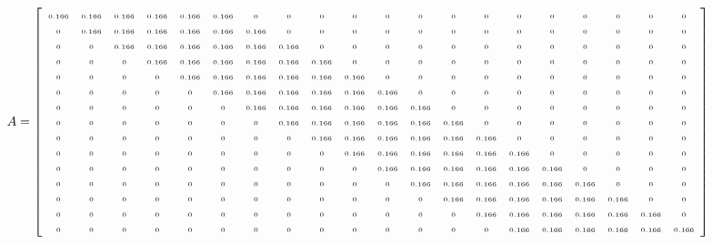 \documentclass[12pt]{article}
\begin{document}
        \[  \fontsize{5}{2}
            A=
            \left[
            \begin{array}{cccccccccccccccccccc}
                0.166 & 0.166 & 0.166 & 0.166 & 0.166 & 0.166 & 0 & 0 & 0 & 0 & 0 & 0 & 0 & 0 & 0 & 0 & 0 & 0 & 0 & 0\\
                0 & 0.166 & 0.166 & 0.166 & 0.166 & 0.166 & 0.166 & 0 & 0 & 0 & 0 & 0 & 0 & 0 & 0 & 0 & 0 & 0 & 0 & 0\\
                0 & 0 & 0.166 & 0.166 & 0.166 & 0.166 & 0.166 & 0.166 & 0 & 0 & 0 & 0 & 0 & 0 & 0 & 0 & 0 & 0 & 0 & 0\\
                0 & 0 & 0 & 0.166 & 0.166 & 0.166 & 0.166 & 0.166 & 0.166 & 0 & 0 & 0 & 0 & 0 & 0 & 0 & 0 & 0 & 0 & 0\\
                0 & 0 & 0 & 0 & 0.166 & 0.166 & 0.166 & 0.166 & 0.166 & 0.166 & 0 & 0 & 0 & 0 & 0 & 0 & 0 & 0 & 0 & 0\\
                0 & 0 & 0 & 0 & 0 & 0.166 & 0.166 & 0.166 & 0.166 & 0.166 & 0.166 & 0 & 0 & 0 & 0 & 0 & 0 & 0 & 0 & 0\\
                0 & 0 & 0 & 0 & 0 & 0 & 0.166 & 0.166 & 0.166 & 0.166 & 0.166 & 0.166 & 0 & 0 & 0 & 0 & 0 & 0 & 0 & 0\\
                0 & 0 & 0 & 0 & 0 & 0 & 0 & 0.166 & 0.166 & 0.166 & 0.166 & 0.166 & 0.166 & 0 & 0 & 0 & 0 & 0 & 0 & 0\\
                0 & 0 & 0 & 0 & 0 & 0 & 0 & 0 & 0.166 & 0.166 & 0.166 & 0.166 & 0.166 & 0.166 & 0 & 0 & 0 & 0 & 0 & 0\\
                0 & 0 & 0 & 0 & 0 & 0 & 0 & 0 & 0 & 0.166 & 0.166 & 0.166 & 0.166 & 0.166 & 0.166 & 0 & 0 & 0 & 0 & 0\\
                0 & 0 & 0 & 0 & 0 & 0 & 0 & 0 & 0 & 0 & 0.166 & 0.166 & 0.166 & 0.166 & 0.166 & 0.166 & 0 & 0 & 0 & 0\\
                0 & 0 & 0 & 0 & 0 & 0 & 0 & 0 & 0 & 0 & 0 & 0.166 & 0.166 & 0.166 & 0.166 & 0.166 & 0.166 & 0 & 0 & 0\\
                0 & 0 & 0 & 0 & 0 & 0 & 0 & 0 & 0 & 0 & 0 & 0 & 0.166 & 0.166 & 0.166 & 0.166 & 0.166 & 0.166 & 0 & 0\\
                0 & 0 & 0 & 0 & 0 & 0 & 0 & 0 & 0 & 0 & 0 & 0 & 0 & 0.166 & 0.166 & 0.166 & 0.166 & 0.166 & 0.166 & 0\\
                0 & 0 & 0 & 0 & 0 & 0 & 0 & 0 & 0 & 0 & 0 & 0 & 0 & 0 & 0.166 & 0.166 & 0.166 & 0.166 & 0.166 & 0.166\\
            \end{array}
            \right]
        \]
\end{document}
